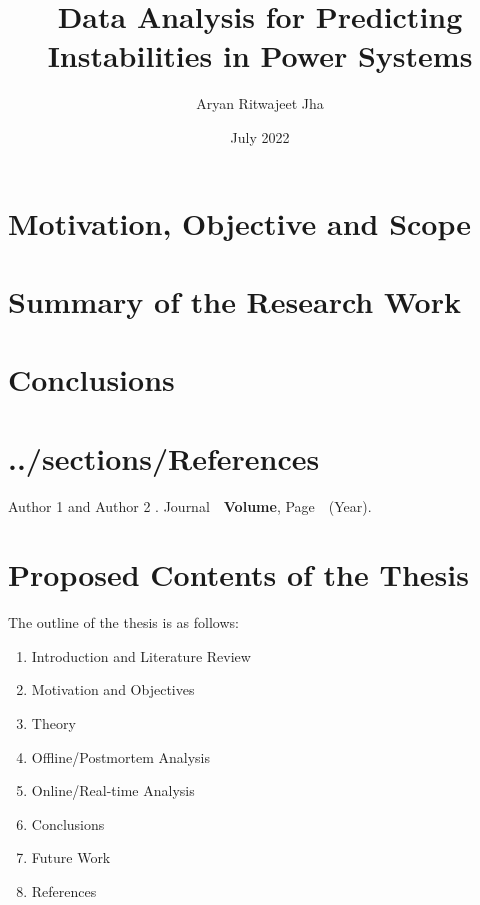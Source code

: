 \documentclass[MS,synopsis]{iitddiss}
\title{Data Analysis for Predicting Instabilities in Power Systems}
\author{Aryan Ritwajeet Jha}
\date{July 2022}
\begin{document}
\maketitle



\setcounter{page}{0}


\section{Motivation, Objective and Scope}

\section{Summary of the Research Work}

\section{Conclusions}

\section{../sections/References}


\begin{singlespace}
\begin{thebibliography}{10}

Author 1 and Author 2
.
\newblock Journal\ \ {\bf Volume}, Page\ \ (Year).
\end{thebibliography}

\end{singlespace}

\section{Proposed Contents of the Thesis}
The outline of the thesis is as follows:
\begin{enumerate}
\item Introduction and Literature Review
\item Motivation and Objectives
\item Theory
\item Offline/Postmortem Analysis
\item Online/Real-time Analysis
\item Conclusions
\item Future Work
\item References
\end{enumerate}
\end{document}

